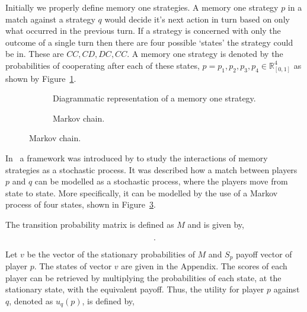 \documentclass[10pt]{article}
\newcommand{\R}{\mathbb{R}}
\begin{document}
Initially we properly define memory one strategies. A memory one strategy \(p\)
in a match against a strategy \(q\) would decide it's next action in turn based
on only what occurred in the previous turn. If a strategy is concerned with only
the outcome of a single turn then there are four possible `states' the strategy
could be in. These are \(CC, CD, DC,CC\). A memory one strategy is denoted by the
probabilities of cooperating after each of these states,
\(p=p_1, p_2, p_3, p_4 \in \R_{[0,1]} ^ 4\) as shown by Figure~\ref{fig:diagrammatic_mem_one}.

\begin{figure}
    \begin{center}
    \begin{subfigure}{0.45\textwidth}
        
        \caption{Diagrammatic representation of a memory one strategy.}
        \label{fig:diagrammatic_mem_one}
    \end{subfigure}
    \begin{subfigure}{0.45\textwidth}
        
        \caption{Markov chain.}
        \label{fig:markov_chain}
    \end{subfigure}
    \end{center}
\end{figure}

In~\cite{Nowak1990} a framework was introduced by to study the interactions of memory
strategies as a stochastic process. It was described how a match between players
\(p\) and \(q\) can be modelled as a stochastic process, where the players move
from state to  state. More specifically, it can be modelled by the use of a Markov
process of four states, shown in Figure~\ref{fig:markov_chain}.

The transition probability matrix is defined as \(M\) and is given
by,

\begin{equation}\label{eq:m_matrix}
    .
\end{equation}

Let \(v\) be the vector of the stationary probabilities of \(M\) and \(S_p\)
payoff vector of player \(p\). The states of vector \(v\) are given in the
Appendix. The scores of each player can be
retrieved by multiplying the probabilities of each state, at the stationary state,
with the equivalent payoff. Thus, the  utility for player \(p\) against \(q\),
denoted as \(u_q(p)\), is defined by,
\end{document}

